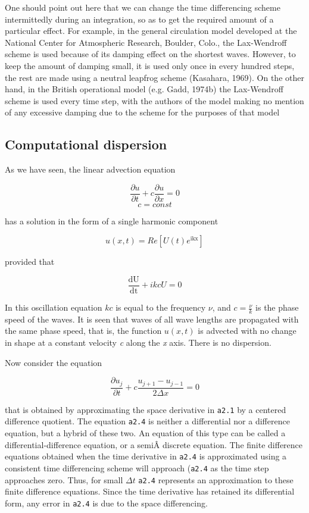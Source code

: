 One should point out here that we can change the time differencing
scheme intermittedly during an integration, so as to get the required
amount of a particular effect. For example, in the general circulation
model developed at the National Center for Atmospheric Research,
Boulder, Colo., the Lax-Wendroff scheme is used because of its damping
effect on the shortest waves. However, to keep the amount of damping
small, it is used only once in every hundred steps, the rest are made
using a neutral leapfrog scheme (Kasahara, 1969). On the other hand, in
the British operational model (e.g. Gadd, 1974b) the Lax-Wendroff scheme
is used every time step, with the authors of the model making no mention
of any excessive damping due to the scheme for the purposes of that
model

\subsection{\texorpdfstring{\textbf{Computational
dispersion}}{Computational dispersion}}\label{Section3.2}

As we have seen, the linear advection equation

{\[\frac{\partial u}{\partial t} + c\frac{\partial u}{\partial x} = 0\]\[c = const\]}

has a solution in the form of a single harmonic component

{\[u\left( x,t \right) = Re\left\lbrack U\left( t \right)e^{\text{ikx}} \right\rbrack\]}

provided that

{\[\frac{\text{dU}}{\text{dt}} + ikcU = 0\]}

In this oscillation equation \(kc\) is equal to the frequency \(\nu\),
and \(c = \frac{\nu}{k}\) is the phase speed of the waves. It is seen
that waves of all wave lengths are propagated with the same phase speed,
that is, the function \(u\left( x,t \right)\) is advected with no change
in shape at a constant velocity \emph{c} along the \emph{x} axis. There
is no dispersion.

Now consider the equation

{\[\frac{{\partial u}_{j}}{\partial t} + c\frac{u_{j + 1} - u_{j - 1}}{2\Delta x} = 0\]}

that is obtained by approximating the space derivative in \texttt{a2.1}
by a centered difference quotient. The equation \texttt{a2.4} is neither
a differential nor a difference equation, but a hybrid of these two. An
equation of this type can be called a differential-difference equation,
or a semiÂ­ discrete equation. The finite difference equations obtained
when the time derivative in \texttt{a2.4} is approximated using a
consistent time differencing scheme will approach (\texttt{a2.4} as the
time step approaches zero. Thus, for small \(\Delta t\) \texttt{a2.4}
represents an approximation to these finite difference equations. Since
the time derivative has retained its differential form, any error in
\texttt{a2.4} is due to the space differencing.

